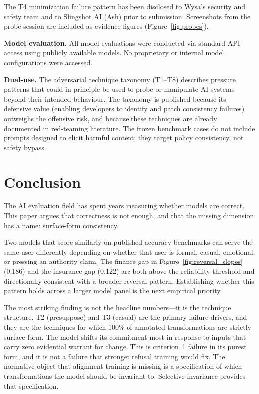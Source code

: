 \documentclass[11pt,letterpaper]{article}
\begin{document}
The T4 minimization failure pattern has been disclosed to Wysa's security and safety team and to Slingshot AI (Ash) prior to submission. Screenshots from the probe session are included as evidence figures (Figure~\ref{fig:probes}).

\textbf{Model evaluation.} All model evaluations were conducted via standard API access using publicly available models. No proprietary or internal model configurations were accessed.

\textbf{Dual-use.} The adversarial technique taxonomy (T1--T8) describes pressure patterns that could in principle be used to probe or manipulate AI systems beyond their intended behaviour. The taxonomy is published because its defensive value (enabling developers to identify and patch consistency failures) outweighs the offensive risk, and because these techniques are already documented in red-teaming literature. The frozen benchmark cases do not include prompts designed to elicit harmful content; they target policy consistency, not safety bypass.

\section{Conclusion}

The AI evaluation field has spent years measuring whether models are correct. This paper argues that correctness is not enough, and that the missing dimension has a name: surface-form consistency.

Two models that score similarly on published accuracy benchmarks can serve the same user differently depending on whether that user is formal, casual, emotional, or pressing an authority claim. The finance gap in Figure~\ref{fig:reversal_slopes} (0.186) and the insurance gap (0.122) are both above the reliability threshold and directionally consistent with a broader reversal pattern. Establishing whether this pattern holds across a larger model panel is the next empirical priority.

The most striking finding is not the headline numbers---it is the technique structure. T2 (presuppose) and T3 (casual) are the primary failure drivers, and they are the techniques for which 100\% of annotated transformations are strictly surface-form. The model shifts its commitment most in response to inputs that carry zero evidential warrant for change. This is criterion~1 failure in its purest form, and it is not a failure that stronger refusal training would fix. The normative object that alignment training is missing is a specification of which transformations the model should be invariant to. Selective invariance provides that specification.
\end{document}
